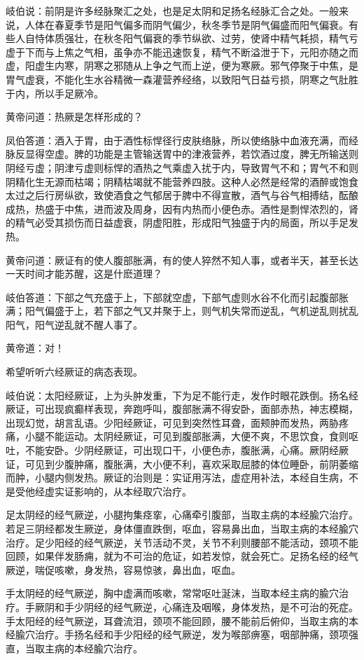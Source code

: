 \documentclass[12pt,UTF8]{ctexbook}
\begin{document}
岐伯说：前阴是许多经脉聚汇之处，也是足太阴和足扬名经脉汇合之处。一般来说，人体在春夏季节是阳气偏多而阴气偏少，秋冬季节是阴气偏盛而阳气偏衰。有些人自恃体质强壮，在秋冬阳气偏衰的季节纵欲、过劳，使肾中精气耗损，精气亏虚于下而与上焦之气相，虽争亦不能迅速恢复，精气不断溢泄于下，元阳亦随之而虚，阳虚生内寒，阴寒之邪随从上争之气而上逆，便为寒厥。邪气停聚于中焦，是胃气虚衰，不能化生水谷精微一森灌营养经络，以致阳气日益亏损，阴寒之气肚胜于内，所以手足厥冷。

黄帝问道：热厥是怎样形成的？

凤伯答道：酒入于胃，由于酒性标悍径行皮肤络脉，所以使络脉中血液充满，而经脉反显得空虚。脾的功能是主管输送胃中的津液营养，若饮酒过度，脾无所输送则阴经亏虚；阴津亏虚则标悍的酒热之气乘虚入扰于内，导致胃气不和；胃气不和则阴精化生无源而枯竭；阴精枯竭就不能营养四肢。这种人必然是经常的酒醉或饱食太过之后行房纵欲，致使酒食之气郁居于脾中不得宣散，酒气与谷气相搏结，酝酿成热，热盛于中焦，进而波及周身，因有内热而小便色赤。酒性是剽悍浓烈的，肾的精气必受其损伤而日益虚衰，阴虚阳胜，形成阳气独盛于内的局面，所以手足发热。

黄帝问道：厥证有的使人腹部胀满，有的使人猝然不知人事，或者半天，甚至长达一天时间才能苏醒，这是什麽道理？

岐伯答道：下部之气充盛于上，下部就空虚，下部气虚则水谷不化而引起腹部胀满；阳气偏盛于上，若下部之气又并聚于上，则气机失常而逆乱，气机逆乱则扰乱阳气，阳气逆乱就不醒人事了。

黄帝道：对！

希望听听六经厥证的病态表现。

岐伯说：太阳经厥证，上为头肿发重，下为足不能行走，发作时眼花跌倒。扬名经厥证，可出现疯癫样表现，奔跑呼叫，腹部胀满不得安卧，面部赤热，神志模糊，出现幻觉，胡言乱语。少阳经厥证，可见到突然性耳聋，面颊肿而发热，两胁疼痛，小腿不能运动。太阴经厥证，可见到腹部胀满，大便不爽，不思饮食，食则呕吐，不能安卧。少阴经厥证，可出现口干，小便色赤，腹胀满，心痛。厥阴经厥证，可见到少腹肿痛，腹胀满，大小便不利，喜欢采取屈膝的体位睡卧，前阴萎缩而肿，小腿内侧发热。厥证的治则是：实证用泻法，虚症用补法，本经自生病，不是受他经虚实证影响的，从本经取穴治疗。

足太阴经的经气厥逆，小腿拘集痉挛，心痛牵引腹部，当取主病的本经腧穴治疗。若足三阴经都发生厥逆，身体僵直跌倒，呕血，容易鼻出血，当取主病的本经腧穴治疗。足少阳经的经气厥逆，关节活动不灵，关节不利则腰部不能活动，颈项不能回顾，如果伴发肠痈，就为不可治的危证，如若发惊，就会死亡。足扬名经的经气厥逆，喘促咳嗽，身发热，容易惊骇，鼻出血，呕血。

手太阴经的经气厥逆，胸中虚满而咳嗽，常常呕吐涎沫，当取本经主病的腧穴治疗。手厥阴和手少阴经的经气厥逆，心痛连及咽喉，身体发热，是不可治的死症。手太阳经的经气厥逆，耳聋流泪，颈项不能回顾，腰不能前后俯仰，当取主病的本经腧穴治疗。手扬名经和手少阳经的经气厥逆，发为喉部痹塞，咽部肿痛，颈项强直，当取主病的本经腧穴治疗。
\end{document}
